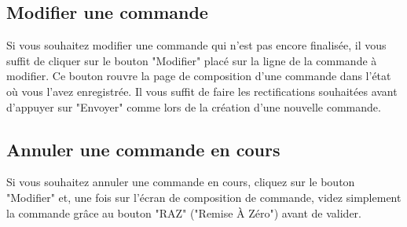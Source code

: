 \subsection{Modifier une commande}
Si vous souhaitez modifier une commande qui n'est pas encore finalisée, il
vous suffit de cliquer sur le bouton "Modifier" placé sur la ligne de la
commande à modifier. Ce bouton rouvre la page de composition d'une commande dans
l'état où vous l'avez enregistrée. Il vous suffit de faire les rectifications
souhaitées avant d'appuyer sur "Envoyer" comme lors de la création d'une
nouvelle commande.

\subsection{Annuler une commande en cours}
Si vous souhaitez annuler une commande en cours, cliquez sur le bouton
"Modifier" et, une fois sur l'écran de composition de commande, videz simplement
la commande grâce au bouton "RAZ" ("Remise À Zéro") avant de valider.
